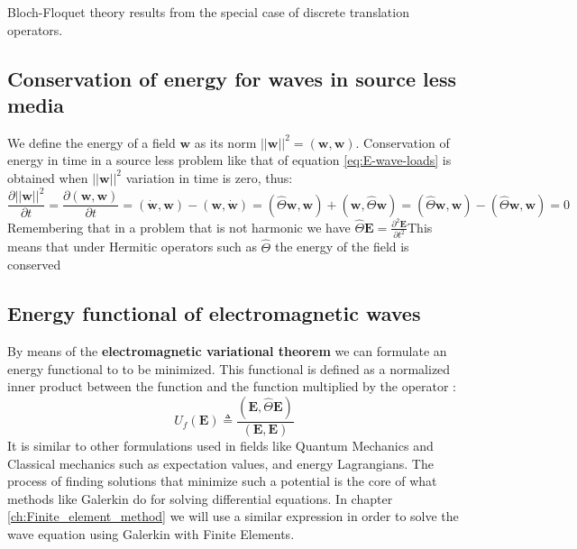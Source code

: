 Bloch-Floquet theory results from the special case of discrete translation operators\cite{J.Gazalet2012}.



\subsection{Conservation of energy for waves in source less media}
We define the energy of a field $\mathbf{w}$ as its norm $||\mathbf{w}||^2 = \left(\mathbf{w},\mathbf{w}\right)$.
Conservation of energy in time in a source less problem like that of equation \ref{eq:E-wave-loads} is obtained when $||\mathbf{w}||^2$ variation in time is zero, thus:
\begin{equation}
\frac{\partial ||\mathbf{w}||^2}{\partial t} =\frac{\partial \left(\mathbf{w},\mathbf{w}\right)}{\partial t} = \left(\dot{\mathbf{w}},\mathbf{w}\right)-\left(\mathbf{w},\dot{\mathbf{w}}\right) = \left(\hat{\Theta}\mathbf{w},\mathbf{w}\right)+\left(\mathbf{w},\hat{\Theta}\mathbf{w}\right) = \left(\hat{\Theta}\mathbf{w},\mathbf{w}\right)-\left(\hat{\Theta}\mathbf{w},\mathbf{w}\right) = 0
\end{equation}
Remembering that in a problem that is not harmonic we have $\hat{\Theta}\mathbf{E} = \frac{\partial^2 \mathbf{E}}{\partial t^2}$This means that under Hermitic operators such as $\hat{\Theta}$ the energy of the field is conserved
 \subsection{Energy functional of electromagnetic waves}
 
By means of the \textbf{electromagnetic variational theorem} we can formulate an energy functional to  to be minimized. This functional is defined as a normalized inner product between the function and the function multiplied by the operator :
\begin{equation}
U_f(\mathbf{E}) \triangleq \frac{\left(\mathbf{E}, \hat{\Theta} \mathbf{E}\right)}{\left(\mathbf{E},\mathbf{E}\right)}
\label{eq:energy_functional}
\end{equation}
It is similar to other formulations used in fields like Quantum Mechanics and Classical mechanics such as expectation values, and energy Lagrangians.  The process of finding solutions that minimize such a potential is the core of what methods like Galerkin do for solving differential equations. In chapter \ref{ch:Finite_element_method} we will use a similar expression in order to solve the wave equation using Galerkin with Finite Elements.
 